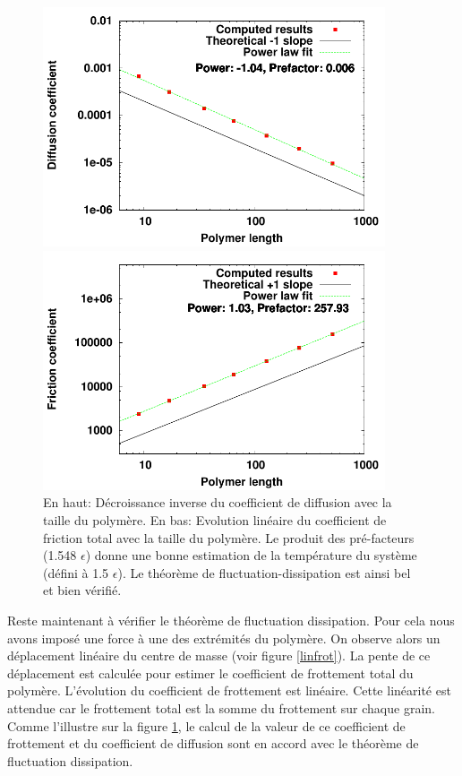 \documentclass[a4paper,11pt]{article}
\begin{document}
\begin{figure}[H]
\begin{center}
\includegraphics[width=0.9\textwidth]{diffusioncoefficient.pdf}

\includegraphics[width=0.9\textwidth]{penteforce.pdf}

\caption{En haut: Décroissance inverse du coefficient de diffusion avec la taille du polymère. En bas: Evolution linéaire du coefficient de friction total avec la taille du polymère.  Le produit des pré-facteurs (1.548 $\epsilon$) donne une bonne estimation de la température du système (défini à 1.5 $\epsilon$). Le théorème de fluctuation-dissipation est ainsi bel et bien vérifié. }
\label{fluctu-dissip}
\end{center}
\end{figure}



Reste maintenant à vérifier le théorème de fluctuation dissipation. Pour cela nous avons imposé une force à une des extrémités du polymère. On observe alors un déplacement linéaire du centre de masse (voir figure \ref{linfrot}). La pente de ce déplacement est calculée pour estimer le coefficient de frottement total du polymère. L'évolution du coefficient de frottement est linéaire. Cette linéarité est attendue car le frottement total est la somme du frottement sur chaque grain. Comme l'illustre sur la figure \ref{fluctu-dissip}, le calcul de la valeur de ce coefficient de frottement et du coefficient de diffusion sont en accord avec le théorème de fluctuation dissipation.
\end{document}
